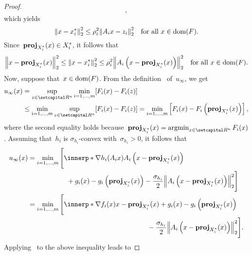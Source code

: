 \documentclass[../main]{subfiles}
\begin{document}
\begin{proof}
\begin{equation}
        ,\end{equation}
    which yields
    \begin{equation}
        \norm*{x - x_i^*}_2^2 \le \rho_i^2 \norm*{A_i x - z_i}_2^2 \forallcondition{x \in \dom(F)}
        .\end{equation}
    Since~$\operatorname{\mathbf{proj}}_{X_i^*}(x) \in X_i^*$, it follows that
    \begin{equation} \label{eq:proximal_PL_MO_sufficient:sc_linear:linear_trans_ineq}
        \norm*{x - \proj_{X_i^*}(x)}_2^2 \le \norm*{x - x_i^*}_2^2 \le \rho_i^2 \norm*{A_i \left(x - \proj_{X_i^*}(x)\right)}_2^2 \forallcondition{x \in \dom(F)}
        .\end{equation}
    Now, suppose that~$x \in \operatorname{dom}(F)$.
    From the definition~ of~$u_\infty$, we get
    \begin{align}
        u_\infty(x) & = \sup_{z \in \setR^n} \min_{i = 1, \dots, m} [F_i(x) - F_i(z)]                                                                                       \\
                    & \le \min_{i = 1, \dots, m} \sup_{z \in \setR^n} [F_i(x) - F_i(z)] = \min_{i = 1, \dots, m} \left[ F_i(x) - F_i\left( \proj_{X_i^*}(x) \right) \right]
        ,\end{align}
    where the second equality holds because~$\proj_{X_i^*}(x) = \argmin_{x \in \setR^n} F_i(x)$.
    Assuming that~$h_i$ is $\sigma_{h_i}$-convex with~$\sigma_{h_i} > 0$, it follows that
    \begin{align}
        u_\infty(x) & = \min_{i = 1, \dots, m}
        \begin{multlined}[t] \Biggl[
                \innerp*{\nabla h_i(A_i x)}{A_i \left(x - \proj_{X_i^*}(x)\right)} \\
                + g_i(x) - g_i\left( \proj_{X_i^*}(x) \right) - \frac{\sigma_{h_i}}{2} \norm*{A_i\left( x - \proj_{X_i^*}(x) \right) }_2^2 \Biggr]
        \end{multlined} \\
                    & = \min_{i = 1, \dots, m}
        \begin{multlined}[t]
            \Biggl[ \innerp*{\nabla f_i(x)}{x - \proj_{X_i^*}(x)} + g_i(x) - g_i\left( \proj_{X_i^*}(x) \right) \\
                - \frac{\sigma_{h_i}}{2} \norm*{A_i \left( x - \proj_{X_i^*}(x) \right) }_2^2 \Biggr]
            .\end{multlined}
    \end{align}
    Applying~ to the above inequality leads to

\end{proof}
\end{document}
